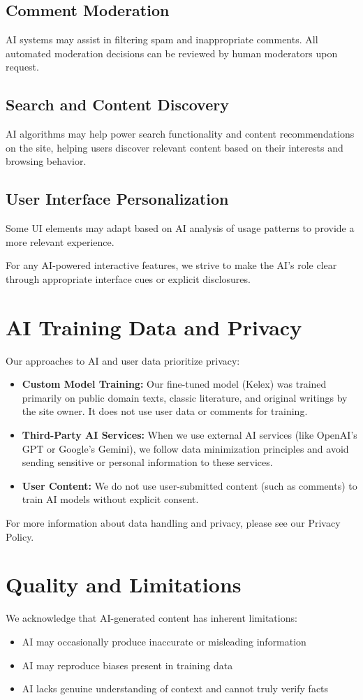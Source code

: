 \documentclass[11pt]{article}
\begin{document}
\subsection{Comment Moderation}
AI systems may assist in filtering spam and inappropriate comments. All automated moderation decisions can be reviewed by human moderators upon request.

\subsection{Search and Content Discovery}
AI algorithms may help power search functionality and content recommendations on the site, helping users discover relevant content based on their interests and browsing behavior.

\subsection{User Interface Personalization}
Some UI elements may adapt based on AI analysis of usage patterns to provide a more relevant experience.

For any AI-powered interactive features, we strive to make the AI's role clear through appropriate interface cues or explicit disclosures.

\section{AI Training Data and Privacy}
Our approaches to AI and user data prioritize privacy:
\begin{itemize}
  \item \textbf{Custom Model Training:} Our fine-tuned model (Kelex) was trained primarily on public domain texts, classic literature, and original writings by the site owner. It does not use user data or comments for training.
  \item \textbf{Third-Party AI Services:} When we use external AI services (like OpenAI's GPT or Google's Gemini), we follow data minimization principles and avoid sending sensitive or personal information to these services.
  \item \textbf{User Content:} We do not use user-submitted content (such as comments) to train AI models without explicit consent.
\end{itemize}

For more information about data handling and privacy, please see our Privacy Policy.

\section{Quality and Limitations}
We acknowledge that AI-generated content has inherent limitations:
\begin{itemize}
  \item AI may occasionally produce inaccurate or misleading information
  \item AI may reproduce biases present in training data
  \item AI lacks genuine understanding of context and cannot truly verify facts
\end{itemize}
\end{document}
